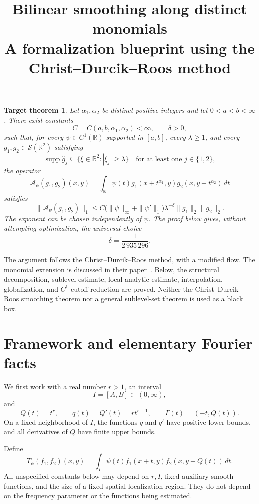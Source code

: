 \documentclass[11pt,a4paper]{article}
\title{Bilinear smoothing along distinct monomials\\[4pt]
\large A formalization blueprint using the Christ--Durcik--Roos method}
\author{}
\date{}
\newcommand{\R}{\mathbb R}
\DeclareMathOperator{\supp}{supp}
\newtheorem*{targettheorem}{Target theorem}
\begin{document}
\maketitle

\begin{targettheorem}
Let $\alpha_1,\alpha_2$ be distinct positive integers and let
$0<a<b<\infty$. There exist constants
\[
C=C(a,b,\alpha_1,\alpha_2)<\infty,
\qquad \delta>0,
\]
such that, for every $\psi\in C^1(\R)$ supported in $[a,b]$, every
$\lambda\geq1$, and every $g_1,g_2\in\mathcal S(\R^2)$ satisfying
\[
\supp\widehat g_j\subseteq\{\xi\in\R^2:|\xi_j|\geq\lambda\}
\quad\text{for at least one }j\in\{1,2\},
\]
the operator
\[
\mathcal A_\psi(g_1,g_2)(x,y)
=\int_{\R}\psi(t)g_1(x+t^{\alpha_1},y)
                    g_2(x,y+t^{\alpha_2})\,dt
\]
satisfies
\[
\|\mathcal A_\psi(g_1,g_2)\|_1
\leq C\bigl(\|\psi\|_\infty+\|\psi'\|_1\bigr)
\lambda^{-\delta}\|g_1\|_2\|g_2\|_2.
\tag{T}\label{eq:target}
\]
The exponent can be chosen independently of $\psi$. The proof below gives,
without attempting optimization, the universal choice
\[
\delta=\frac{1}{2\,935\,296}.
\]
\end{targettheorem}

The argument follows the Christ--Durcik--Roos method, with a modified flow.
The monomial extension is discussed in their paper~\cite{CDR}. Below, the
structural decomposition, sublevel estimate, local analytic estimate,
interpolation, globalization, and $C^1$-cutoff reduction are proved.
Neither the Christ--Durcik--Roos smoothing theorem nor a general
sublevel-set theorem is used as a black box.

\section{Framework and elementary Fourier facts}

We first work with a real number $r>1$, an interval
\[
I=[A,B]\subset(0,\infty),
\]
and
\[
Q(t)=t^r,\qquad q(t)=Q'(t)=rt^{r-1},\qquad
\Gamma(t)=(-t,Q(t)).
\]
On a fixed neighborhood of $I$, the functions $q$ and $q'$ have positive
lower bounds, and all derivatives of $Q$ have finite upper bounds.

Define
\[
T_\psi(f_1,f_2)(x,y)
=\int_I\psi(t)f_1(x+t,y)f_2(x,y+Q(t))\,dt.
\tag{1.1}\label{eq:normalized-operator}
\]
All unspecified constants below may depend on $r,I$, fixed auxiliary smooth
functions, and the size of a fixed spatial localization region. They do not
depend on the frequency parameter or the functions being estimated.
\end{document}
